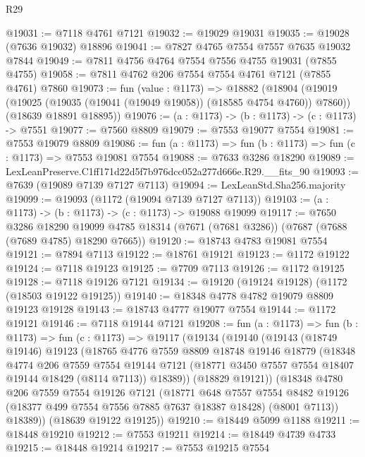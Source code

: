 \begin{lexlean}{R29}
\begin{coremodule}
@19031 := @7118 @4761 @7121
@19032 := @19029 @19031
@19035 := @19028 (@7636 @19032) @18896
@19041 := @7827 @4765 @7554 @7557 @7635 @19032 @7844
@19049 := @7811 @4756 @4764 @7554 @7556 @4755 @19031 (@7855 @4755)
@19058 := @7811 @4762 @206 @7554 @7554 @4761 @7121 (@7855 @4761) @7860
@19073 := fun (value : @1173) =>
  @18882
    (@18904
      (@19019 (@19025 (@19035 (@19041 (@19049 @19058)) (@18585 @4754 @4760)) @7860))
      (@18639 @18891 @18895))
@19076 := (a : @1173) -> (b : @1173) -> (c : @1173) -> @7551
@19077 := @7560 @8809
@19079 := @7553 @19077 @7554
@19081 := @7553 @19079 @8809
@19086 := fun (a : @1173) => fun (b : @1173) => fun (c : @1173) => @7553 @19081 @7554
@19088 := @7633 @3286 @18290
@19089 := LexLeanPreserve.C1ff171d22d5f7b976dcc052a277d666e.R29.__fits_90
@19093 := @7639 (@19089 @7139 @7127 @7113)
@19094 := LexLeanStd.Sha256.majority
@19099 := @19093 (@1172 (@19094 @7139 @7127 @7113))
@19103 := (a : @1173) -> (b : @1173) -> (c : @1173) -> @19088 @19099
@19117 := @7650
    @3286
    @18290
    @19099
    @4785
    @18314
    (@7671 (@7681 @3286))
    (@7687 (@7688 (@7689 @4785) @18290 @7665))
@19120 := @18743 @4783 @19081 @7554
@19121 := @7894 @7113
@19122 := @18761 @19121
@19123 := @1172 @19122
@19124 := @7118 @19123
@19125 := @7709 @7113
@19126 := @1172 @19125
@19128 := @7118 @19126 @7121
@19134 := @19120 (@19124 @19128) (@1172 (@18503 @19122 @19125))
@19140 := @18348 @4778 @4782 @19079 @8809 @19123 @19128
@19143 := @18743 @4777 @19077 @7554
@19144 := @1172 @19121
@19146 := @7118 @19144 @7121
@19208 := fun (a : @1173) =>
  fun (b : @1173) =>
  fun (c : @1173) =>
  @19117
    (@19134
      (@19140
        (@19143
          (@18749 @19146)
          @19123
          (@18765
            @4776
            @7559
            @8809
            @18748
            @19146
            @18779
            (@18348
              @4774
              @206
              @7559
              @7554
              @19144
              @7121
              (@18771 @3450 @7557 @7554 @18407 @19144 @18429 (@8114 @7113))
              @18389))
          (@18829 @19121))
        (@18348
          @4780
          @206
          @7559
          @7554
          @19126
          @7121
          (@18771
            @648
            @7557
            @7554
            @8482
            @19126
            (@18377 @499 @7554 @7556 @7885 @7637 @18387 @18428)
            (@8001 @7113))
          @18389))
      (@18639 @19122 @19125))
@19210 := @18449 @5099 @1188
@19211 := @18448 @19210
@19212 := @7553 @19211
@19214 := @18449 @4739 @4733
@19215 := @18448 @19214
@19217 := @7553 @19215 @7554

\end{coremodule}
\end{lexlean}
